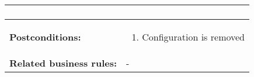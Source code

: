 \begin{tabularx}{\linewidth}{|l|X|}
\begin{enumerate}
						\end{enumerate} \\
\hline
\textbf{Postconditions:} & 
  \begin{minipage}{\linewidth}
  \vspace{0.05em}
  \begin{enumerate}
    \item Configuration is removed
  \end{enumerate}
  \vspace{0.05em}
\end{minipage}
\\
\hline
\textbf{Related business rules:} & - \\
\hline
\end{tabularx}


